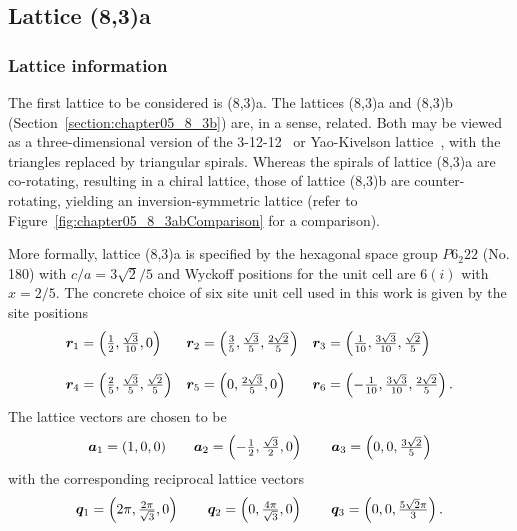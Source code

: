 \subsection{Lattice (8,3)a}
\label{section:chapter05_8_3a}
%
%
\subsubsection{Lattice information}
%
%
The first lattice to be considered is (8,3)a.
The lattices (8,3)a and (8,3)b (Section~\ref{section:chapter05_8_3b}) are, in a sense, related.
Both may be viewed as a three-dimensional version of the 3-12-12~\cite{YangPRB2007} or Yao-Kivelson lattice~\cite{YaoPRL2007}, with the triangles replaced by triangular spirals.
Whereas the spirals of lattice (8,3)a are co-rotating, resulting in a chiral lattice, those of lattice (8,3)b are counter-rotating, yielding an inversion-symmetric lattice (refer to Figure~\ref{fig:chapter05_8_3abComparison} for a comparison).

More formally, lattice (8,3)a is specified by the hexagonal space group $P6_{2}22$ (No. 180) with $c/a = 3\sqrt{2}/5$ and Wyckoff positions for the unit cell are $6(i)$ with $x=2/5$.
The concrete choice of six site unit cell used in this work is given by the site positions
%
\begin{equation}
	\begin{matrix*}[l]
		\br_1 = \left(\frac{1}{2}, \frac{\sqrt{3}}{10}, 0\right) &
		\br_2 = \left(\frac{3}{5}, \frac{\sqrt{3}}{5}, \frac{2\sqrt{2}}{5}\right) &
		\br_3 = \left(\frac{1}{10}, \frac{3\sqrt{3}}{10}, \frac{\sqrt{2}}{5}\right) \\
		&\\
		\br_4 = \left(\frac{2}{5}, \frac{\sqrt{3}}{5}, \frac{\sqrt{2}}{5}\right) &
		\br_5 = \left(0, \frac{2\sqrt{3}}{5}, 0\right) &
		\br_6 = \left(-\frac{1}{10}, \frac{3\sqrt{3}}{10}, \frac{2\sqrt{2}}{5}\right).
	\end{matrix*}
\end{equation}
%
The lattice vectors are chosen to be
%
\begin{equation}
	\begin{matrix*}[l]
		\ba_1 = (1, 0, 0) \qquad
		\ba_2 = \left(-\frac{1}{2}, \frac{\sqrt{3}}{2}, 0\right) \qquad
		\ba_3 = \left(0, 0, \frac{3\sqrt{2}}{5}\right)
	\end{matrix*}
\end{equation}
%
with the corresponding reciprocal lattice vectors
%
\begin{equation}
	\begin{matrix*}[l]
		\bq_1 = \left(2\pi, \frac{2\pi}{\sqrt{3}}, 0\right) \qquad
		\bq_2 = \left(0, \frac{4\pi}{\sqrt{3}}, 0\right) \qquad
		\bq_3 = \left(0, 0, \frac{5\sqrt{2}\pi}{3}\right).
	\end{matrix*}
\end{equation}
%

